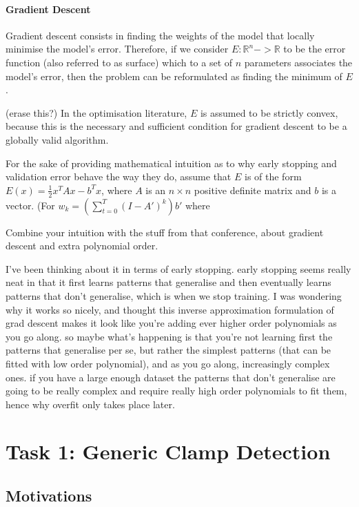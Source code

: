 \documentclass[a4paper,11pt]{article}
\begin{document}
\paragraph{Gradient Descent}

Gradient descent consists in finding the weights of the model that locally minimise the model's error. Therefore, if we consider $E : \mathbb{R}^n -> \mathbb{R}$ to be the error function (also referred to as surface) which to a set of $n$ parameters associates the model's error, then the problem can be reformulated as finding the minimum of $E$. 

(erase this?) In the optimisation literature, $E$ is assumed to be strictly convex, because this is the necessary and sufficient condition for gradient descent to be a globally valid algorithm. 

For the sake of providing mathematical intuition as to why early stopping and validation error behave the way they do, assume that $E$ is of the form $E(x) = \frac{1}{2}x^T Ax - b^T x$, where $A$ is an $n \times n$ positive definite matrix and $b$ is a vector. (For 
$ w_k = ( \sum_{t=0}^{T} (I - A')^k)b'$ where 



Combine your intuition with the stuff from that conference, about gradient descent and extra polynomial order.

I've been thinking about it in terms of early stopping. early stopping seems really neat in that it first learns patterns that generalise and then eventually learns patterns that don't generalise, which is when we stop training. I was wondering why  it works so nicely, and thought this inverse approximation formulation of grad descent makes it look like you're adding ever higher order polynomials as you go along. so maybe what's happening is that you're not learning first the patterns that generalise per se, but rather the simplest patterns (that can be fitted with low order polynomial), and as you go along, increasingly complex ones. if you have a large enough dataset the patterns that don't generalise are going to be really complex and require really high order polynomials to fit them, hence why overfit only takes place later.

\section{Task 1: Generic Clamp Detection}


\subsection{Motivations}
\end{document}
